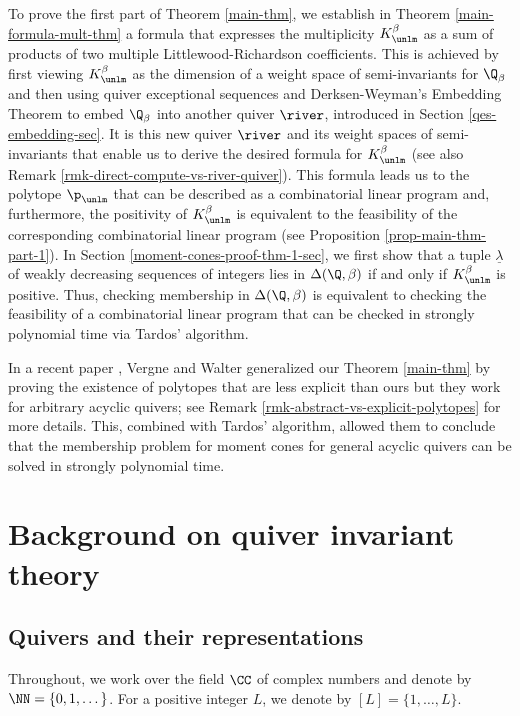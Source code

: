 To prove the first part of Theorem \ref{main-thm}, we establish in Theorem \ref{main-formula-mult-thm} a formula that expresses the multiplicity $K^{\beta}_{\unlm}$ as a sum of products of two multiple Littlewood-Richardson coefficients. This is achieved by first viewing $K^{\beta}_{\unlm}$ as the dimension of a weight space of semi-invariants for $\Q_\beta$ and then using quiver exceptional sequences and Derksen-Weyman's Embedding Theorem to embed $\Q_\beta$ into another quiver $\river$, introduced in Section \ref{qes-embedding-sec}. It is this new quiver $\river$ and its weight spaces of semi-invariants that enable us to derive the desired formula for $K^{\beta}_{\unlm}$ (see also Remark \ref{rmk-direct-compute-vs-river-quiver}). This formula leads us to the polytope $\p_{\unlm}$ that can be described as a combinatorial linear program and, furthermore, the positivity of $K^{\beta}_{\unlm}$ is equivalent to the feasibility of the corresponding combinatorial linear program (see Proposition \ref{prop-main-thm-part-1}). In Section \ref{moment-cones-proof-thm-1-sec}, we first show that a tuple $\underline{\lambda}$ of weakly decreasing sequences of integers lies in $\Delta(\Q, \beta)$ if and only if $K^{\beta}_{\unlm}$ is positive. Thus, checking membership in $\Delta(\Q, \beta)$ is equivalent to checking the feasibility of a combinatorial linear program that can be checked in strongly polynomial time via Tardos' algorithm.

In a recent paper \cite{Ver-Wal-2023}, Vergne and Walter generalized our Theorem \ref{main-thm} by proving the existence of polytopes that are less explicit than ours but they work for arbitrary acyclic quivers; see Remark \ref{rmk-abstract-vs-explicit-polytopes} for more details. This, combined with Tardos' algorithm, allowed them to conclude that the membership problem for moment cones for general acyclic quivers can be solved in strongly polynomial time. 

\section{Background on quiver invariant theory}\label{QIT-semi-invariants-sec}

\subsection{Quivers and their representations} Throughout, we work over the field $\CC$ of complex numbers and denote by $\NN=\{0,1,\dots \}$. For a positive integer $L$, we denote by $[L]=\{1, \ldots, L\}$.

